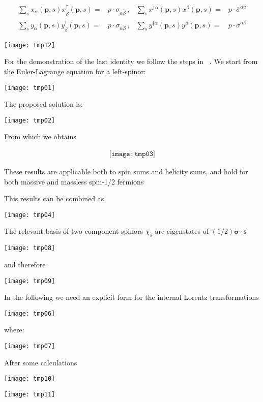 \begin{frame}
\begin{align}
\label{eq:xxd}
  \sum_s x_{\alpha}(\mathbf{p},s)x^{\dagger}_{\dot{\beta}}(\mathbf{p},s)=&p\cdot \sigma_{\alpha\dot{\beta}}\,, &    \sum_s x^{\dagger \dot{\alpha}}(\mathbf{p},s) x^{\beta}(\mathbf{p},s)=&p\cdot \overline{\sigma}^{\dot{\alpha}\beta}\nonumber\\
  \sum_s y_{\alpha}(\mathbf{p},s)y^{\dagger}_{\dot{\beta}}(\mathbf{p},s)=&p\cdot \sigma_{\alpha\dot{\beta}}\,, &   \sum_s y^{\dagger \dot{\alpha}}(\mathbf{p},s) y^{\beta}(\mathbf{p},s)=&p\cdot \overline{\sigma}^{\dot{\alpha}\beta} 
\end{align}

\texttt{[image: tmp12]} 


For the demonstration of the last identity we follow the steps in ~\cite{Dreiner:2008tw}. We start from the Euler-Lagrange equation for a left-spinor:

\texttt{[image: tmp01]} 

The proposed solution is:

\texttt{[image: tmp02]} 

From which we obtains 

\begin{align}
  \texttt{[image: tmp03]} 
\end{align}

These results are applicable both to spin sums and helicity sums, and hold for both massive and massless spin-1/2 fermions

This results can be combined as 

\texttt{[image: tmp04]}

The relevant basis of two-component spinors $\chi_s$ are eigenstates of $(1/2)\boldsymbol{\sigma}\cdot \boldsymbol{s}$

\texttt{[image: tmp08]}  

and therefore

\texttt{[image: tmp09]}  



In the following we need an explicit form for the internal Lorentz transformations

\texttt{[image: tmp06]} 

where:

\texttt{[image: tmp07]} 

After some calculations 

\texttt{[image: tmp10]} 

\texttt{[image: tmp11]} 


\end{frame}

